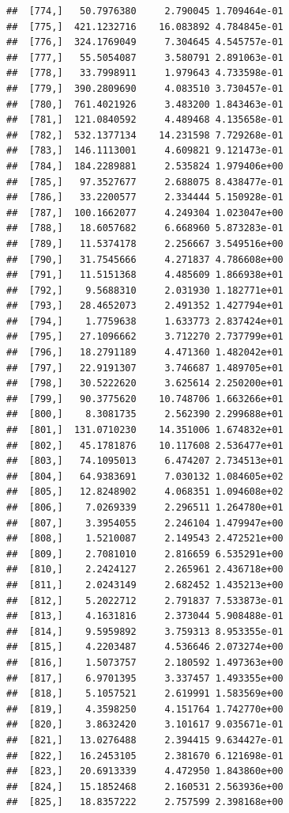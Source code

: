 \documentclass[article]{jss}\usepackage[]{graphicx}\usepackage[]{xcolor}
\makeatletter
\newenvironment{kframe}{%
 \def\at@end@of@kframe{}%
 \ifinner\ifhmode%
  \def\at@end@of@kframe{\end{minipage}}%
  \begin{minipage}{\columnwidth}%
 \fi\fi%
 \def\FrameCommand##1{\hskip\@totalleftmargin \hskip-\fboxsep
 \colorbox{shadecolor}{##1}\hskip-\fboxsep
     \hskip-\linewidth \hskip-\@totalleftmargin \hskip\columnwidth}%
 \MakeFramed {\advance\hsize-\width
   \@totalleftmargin\z@ \linewidth\hsize
   \@setminipage}}%
 {\par\unskip\endMakeFramed%
 \at@end@of@kframe}
\newenvironment{knitrout}{}{} %
\makeatother
\begin{document}
\begin{knitrout}
\begin{kframe}
\begin{verbatim}
##  [774,]   50.7976380     2.790045 1.709464e-01
##  [775,]  421.1232716    16.083892 4.784845e-01
##  [776,]  324.1769049     7.304645 4.545757e-01
##  [777,]   55.5054087     3.580791 2.891063e-01
##  [778,]   33.7998911     1.979643 4.733598e-01
##  [779,]  390.2809690     4.083510 3.730457e-01
##  [780,]  761.4021926     3.483200 1.843463e-01
##  [781,]  121.0840592     4.489468 4.135658e-01
##  [782,]  532.1377134    14.231598 7.729268e-01
##  [783,]  146.1113001     4.609821 9.121473e-01
##  [784,]  184.2289881     2.535824 1.979406e+00
##  [785,]   97.3527677     2.688075 8.438477e-01
##  [786,]   33.2200577     2.334444 5.150928e-01
##  [787,]  100.1662077     4.249304 1.023047e+00
##  [788,]   18.6057682     6.668960 5.873283e-01
##  [789,]   11.5374178     2.256667 3.549516e+00
##  [790,]   31.7545666     4.271837 4.786608e+00
##  [791,]   11.5151368     4.485609 1.866938e+01
##  [792,]    9.5688310     2.031930 1.182771e+01
##  [793,]   28.4652073     2.491352 1.427794e+01
##  [794,]    1.7759638     1.633773 2.837424e+01
##  [795,]   27.1096662     3.712270 2.737799e+01
##  [796,]   18.2791189     4.471360 1.482042e+01
##  [797,]   22.9191307     3.746687 1.489705e+01
##  [798,]   30.5222620     3.625614 2.250200e+01
##  [799,]   90.3775620    10.748706 1.663266e+01
##  [800,]    8.3081735     2.562390 2.299688e+01
##  [801,]  131.0710230    14.351006 1.674832e+01
##  [802,]   45.1781876    10.117608 2.536477e+01
##  [803,]   74.1095013     6.474207 2.734513e+01
##  [804,]   64.9383691     7.030132 1.084605e+02
##  [805,]   12.8248902     4.068351 1.094608e+02
##  [806,]    7.0269339     2.296511 1.264780e+01
##  [807,]    3.3954055     2.246104 1.479947e+00
##  [808,]    1.5210087     2.149543 2.472521e+00
##  [809,]    2.7081010     2.816659 6.535291e+00
##  [810,]    2.2424127     2.265961 2.436718e+00
##  [811,]    2.0243149     2.682452 1.435213e+00
##  [812,]    5.2022712     2.791837 7.533873e-01
##  [813,]    4.1631816     2.373044 5.908488e-01
##  [814,]    9.5959892     3.759313 8.953355e-01
##  [815,]    4.2203487     4.536646 2.073274e+00
##  [816,]    1.5073757     2.180592 1.497363e+00
##  [817,]    6.9701395     3.337457 1.493355e+00
##  [818,]    5.1057521     2.619991 1.583569e+00
##  [819,]    4.3598250     4.151764 1.742770e+00
##  [820,]    3.8632420     3.101617 9.035671e-01
##  [821,]   13.0276488     2.394415 9.634427e-01
##  [822,]   16.2453105     2.381670 6.121698e-01
##  [823,]   20.6913339     4.472950 1.843860e+00
##  [824,]   15.1852468     2.160531 2.563936e+00
##  [825,]   18.8357222     2.757599 2.398168e+00

\end{verbatim}
\end{kframe}
\end{knitrout}
\end{document}
